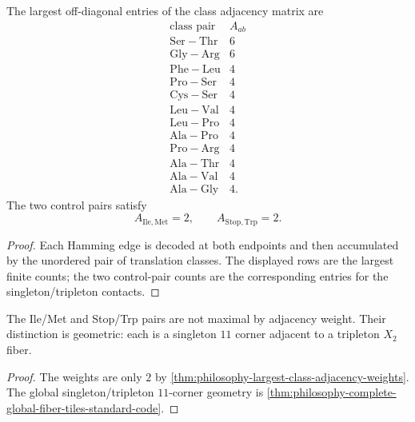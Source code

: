 \begin{theorem}
\label{thm:philosophy-largest-class-adjacency-weights}
The largest off-diagonal entries of the class adjacency matrix are
$$
\begin{array}{c|r}
  \text{class pair} & A_{ab}\\
\hline
  \mathrm{Ser}{-}\mathrm{Thr} & 6\\
  \mathrm{Gly}{-}\mathrm{Arg} & 6\\
  \mathrm{Phe}{-}\mathrm{Leu} & 4\\
  \mathrm{Pro}{-}\mathrm{Ser} & 4\\
  \mathrm{Cys}{-}\mathrm{Ser} & 4\\
  \mathrm{Leu}{-}\mathrm{Val} & 4\\
  \mathrm{Leu}{-}\mathrm{Pro} & 4\\
  \mathrm{Ala}{-}\mathrm{Pro} & 4\\
  \mathrm{Pro}{-}\mathrm{Arg} & 4\\
  \mathrm{Ala}{-}\mathrm{Thr} & 4\\
  \mathrm{Ala}{-}\mathrm{Val} & 4\\
  \mathrm{Ala}{-}\mathrm{Gly} & 4.
\end{array}
$$
The two control pairs satisfy
$$
  A_{\mathrm{Ile},\mathrm{Met}}=2,
  \qquad
  A_{\mathrm{Stop},\mathrm{Trp}}=2.
$$
\end{theorem}
\begin{proof}
Each Hamming edge is decoded at both endpoints and then accumulated by
the unordered pair of translation classes. The displayed rows are the
largest finite counts; the two control-pair counts are the corresponding
entries for the singleton/tripleton contacts.
\end{proof}

\begin{corollary}
\label{cor:philosophy-control-pairs-corner-contacts}
The Ile/Met and Stop/Trp pairs are not maximal by adjacency weight.
Their distinction is geometric: each is a singleton $11$ corner adjacent
to a tripleton $X_{2}$ fiber.
\end{corollary}
\begin{proof}
The weights are only $2$ by
\autoref{thm:philosophy-largest-class-adjacency-weights}. The global
singleton/tripleton $11$-corner geometry is
\autoref{thm:philosophy-complete-global-fiber-tiles-standard-code}.
\end{proof}

